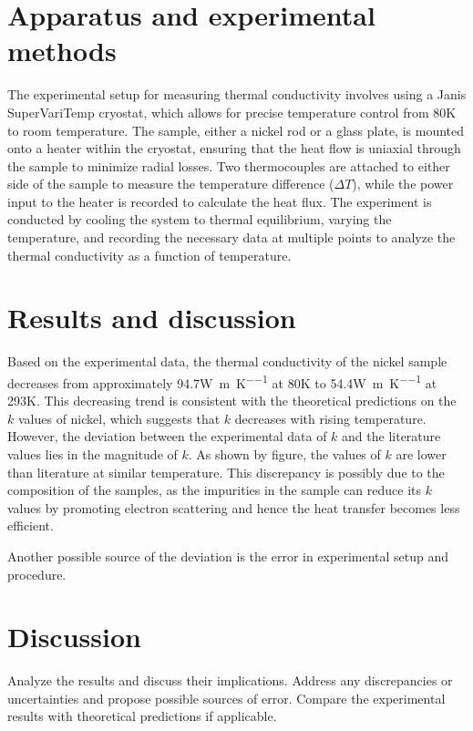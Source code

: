 \documentclass[a4paper,12pt]{article}
\begin{document}
\section{Apparatus and experimental methods}
\label{sec:procedure}
The experimental setup for measuring thermal conductivity involves using a Janis SuperVariTemp cryostat, which allows for precise temperature control from 80\si{\kelvin} to room temperature. The sample, either a nickel rod or a glass plate, is mounted onto a heater within the cryostat, ensuring that the heat flow is uniaxial through the sample to minimize radial losses. Two thermocouples are attached to either side of the sample to measure the temperature difference ($\Delta T$), while the power input to the heater is recorded to calculate the heat flux. The experiment is conducted by cooling the system to thermal equilibrium, varying the temperature, and recording the necessary data at multiple points to analyze the thermal conductivity as a function of temperature.

\section{Results and discussion}
\label{sec:results}
Based on the experimental data, the thermal conductivity of the nickel sample decreases from approximately 94.7\si{\watt\per\meter\per\kelvin} at 80\si{\kelvin} to 54.4\si{\watt\per\meter\per\kelvin} at 293\si{\kelvin}. This decreasing trend is consistent with the theoretical predictions on the $k$ values of nickel, which suggests that $k$ decreases with rising temperature. However, the deviation between the experimental data of $k$ and the literature values lies in the magnitude of $k$. As shown by figure, the values of $k$ are lower than literature at similar temperature. This discrepancy is possibly due to the composition of the samples, as the impurities in the sample can reduce its $k$ values by promoting electron scattering\autocite{chen2021effects} and hence the heat transfer becomes less efficient.\par
Another possible source of the deviation is the error in experimental setup and procedure.

\section{Discussion}
\label{sec:discussion}
Analyze the results and discuss their implications. Address any discrepancies or uncertainties and propose possible sources of error. Compare the experimental results with theoretical predictions if applicable.
\end{document}
